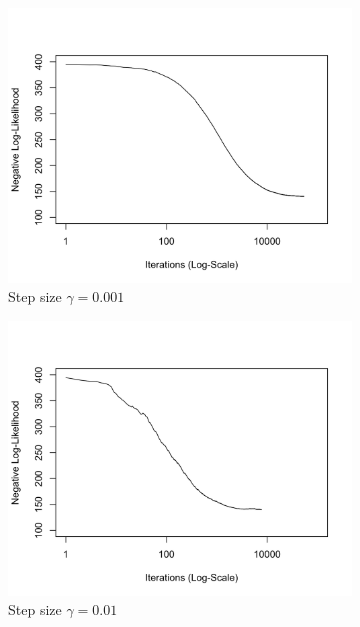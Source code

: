 \documentclass[11 pt]{article}
\begin{document}
\begin{enumerate}[label=(\Alph*)]
\begin{figure}[H]
	\begin{center}
		\begin{subfigure}[h]{0.45\linewidth}
			\includegraphics[width=\linewidth]{Fig/F1PC0001.png}
			\caption{Step size $\gamma=0.001$}
		\end{subfigure}
		\begin{subfigure}[h]{0.45\linewidth}
			\includegraphics[width=\linewidth]{Fig/F1PC001.png}
			\caption{Step size $\gamma=0.01$}
		\end{subfigure}
		\begin{subfigure}[h]{0.45\linewidth}

\end{subfigure}
\end{center}
\end{figure}
\end{enumerate}
\end{document}
